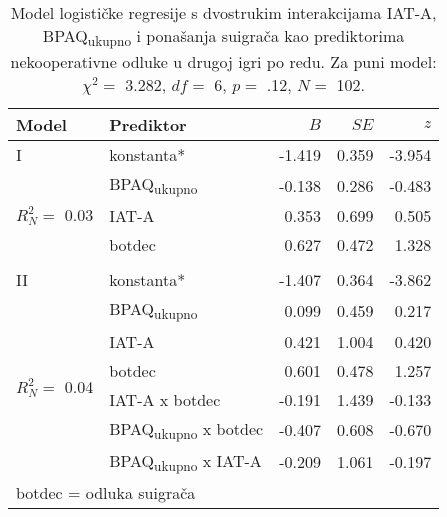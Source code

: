 \documentclass[a4paper, 12pt]{report}
\begin{document}
\begin{table}
    \begin{center}
        \caption{\label{glmtotgam22} Model logističke regresije s dvostrukim interakcijama IAT-A,
            BPAQ\textsubscript{ukupno} i ponašanja suigrača kao prediktorima
            nekooperativne odluke u drugoj igri po redu. Za puni
            model: $\chi^2 =$
            3.282, $df =$ 6, $p =$ .12, $N =$ 102.}
        \hspace*{-0.5cm}\begin{tabular}{llrrr}
        \toprule
        Model & Prediktor & $B$ & $SE$ & $z$\\
        \midrule
        I & konstanta* & -1.419 & 0.359 & -3.954 \\
        \multirow{3}{*}{$R^2_N =$ 0.03}
        &BPAQ\textsubscript{ukupno} & -0.138 & 0.286 & -0.483 \\
        &IAT-A & 0.353 & 0.699 & 0.505 \\
        &botdec & 0.627 & 0.472 & 1.328 \\
        &&&&\\ 
        II & konstanta* & -1.407 & 0.364 & -3.862 \\
        \multirow{6}{*}{$R^2_N =$ 0.04}
        &BPAQ\textsubscript{ukupno} & 0.099 & 0.459 & 0.217 \\
        &IAT-A & 0.421 & 1.004 & 0.420 \\
        &botdec & 0.601 & 0.478 & 1.257  \\
        &IAT-A x botdec & -0.191 & 1.439 & -0.133 \\
        &BPAQ\textsubscript{ukupno} x botdec & -0.407 & 0.608 & -0.670 \\
        &BPAQ\textsubscript{ukupno} x IAT-A & -0.209 & 1.061 & -0.197 \\
        \bottomrule
        \multicolumn{5}{l}{
            \parbox{3cm}{\scriptsize \vspace{3pt} 
                botdec = odluka suigrača
        }}
    \end{tabular}
\end{center}
\end{table}
\end{document}
